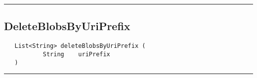 \rule{15cm}{2pt}
\subsection{DeleteBlobsByUriPrefix}
\label{Api:DeleteBlobsByUriPrefix}
\begin{verbatim}
   List<String> deleteBlobsByUriPrefix (
           String    uriPrefix
   )
\end{verbatim}



\rule{15cm}{2pt}

